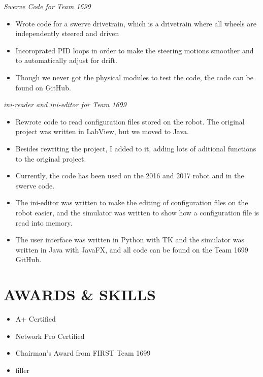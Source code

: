 \documentclass[line,margin]{res}
\begin{document}
\begin{resume}
	{\sl Swerve Code for Team 1699}
		\begin{itemize} 
			\itemsep -2pt
			\item Wrote code for a swerve drivetrain, which is a drivetrain where all wheels are independently steered and driven
			\item Incoroprated PID loops in order to make the steering motions smoother and to automatically adjust for drift.
			\item Though we never got the physical modules to test the code, the code can be found on GitHub.
		\end{itemize}

	\vspace{-8pt}
	{\sl ini-reader and ini-editor for Team 1699}
		\begin{itemize}
			\itemsep -2pt
			\item Rewrote code to read configuration files stored on the robot. The original project was written in LabView, but we moved to Java.
			\item Besides rewriting the project, I added to it, adding lots of aditional functions to the original project.
			\item Currently, the code has been used on the 2016 and 2017 robot and in the swerve code.
			\item The ini-editor was written to make the editing of configuration files on the robot easier, and the simulator was written to show how a configuration file is read into memory.
			\item The user interface was written in Python with TK and the simulator was written in Java with JavaFX, and all code can be found on the Team 1699 GitHub.
		\end{itemize}

\section{AWARDS \& SKILLS} 
		\begin{multicols}{2}
			\begin{itemize}
				\itemsep -2pt
				\item[] A+ Certified
				\item[] Network Pro Certified
				\item[] Chairman's Award from FIRST Team 1699
				\item[] filler


\end{itemize}
\end{multicols}
\end{resume}
\end{document}
